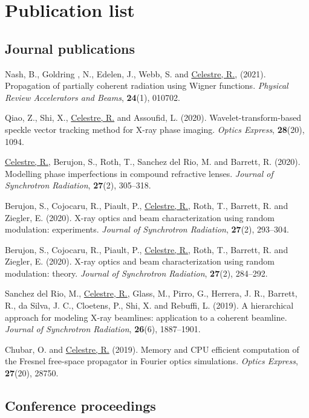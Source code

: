\appendix

\chapter{Publication list}\label{sec:publications}

\section*{Journal publications}

Nash, B., Goldring , N., Edelen, J., Webb, S. and \underline{Celestre, R.}, (2021). Propagation of partially coherent radiation using Wigner functions. \textit{Physical Review Accelerators and Beams}, \textbf{24}(1), 010702. 

Qiao, Z., Shi, X., \underline{Celestre, R.} and Assoufid, L. (2020). Wavelet-transform-based speckle vector tracking method for X-ray phase imaging. \textit{Optics Express}, \textbf{28}(20), 1094. 

\underline{Celestre, R.}, Berujon, S., Roth, T., Sanchez del Rio, M. and Barrett, R. (2020). Modelling phase imperfections in compound refractive lenses. \textit{Journal of Synchrotron Radiation}, \textbf{27}(2), 305–318. 

Berujon, S., Cojocaru, R., Piault, P., \underline{Celestre, R.}, Roth, T., Barrett, R. and Ziegler, E. (2020). X-ray optics and beam characterization using random modulation: experiments. \textit{Journal of Synchrotron Radiation}, \textbf{27}(2), 293–304.

Berujon, S., Cojocaru, R., Piault, P., \underline{Celestre, R.}, Roth, T., Barrett, R. and Ziegler, E. (2020). X-ray optics and beam characterization using random modulation: theory. \textit{Journal of Synchrotron Radiation}, \textbf{27}(2), 284–292.

Sanchez del Rio, M., \underline{Celestre, R.}, Glass, M., Pirro, G., Herrera, J. R., Barrett, R., da Silva, J. C., Cloetens, P., Shi, X. and Rebuffi, L. (2019). A hierarchical approach for modeling X-ray beamlines: application to a coherent beamline. \textit{Journal of Synchrotron Radiation}, \textbf{26}(6), 1887–1901.

Chubar, O. and \underline{Celestre, R.} (2019). Memory and CPU efficient computation of the Fresnel free-space propagator in Fourier optics simulations. \textit{Optics Express}, \textbf{27}(20), 28750. 

\section*{Conference proceedings}

